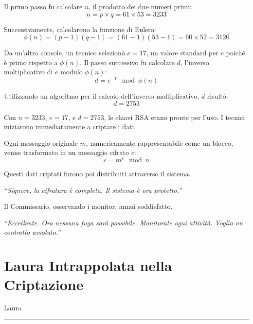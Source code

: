 Il primo passo fu calcolare \( n \), il prodotto dei due numeri primi:
\[
n = p \times q = 61 \times 53 = 3233\]

Successivamente, calcolarono la funzione di Eulero:
\[
\phi(n) = (p-1)(q-1) = (61-1)(53-1) = 60 \times 52 = 3120\]

Da un’altra console, un tecnico selezionò \( e = 17 \), un valore standard per \( e \) poiché è primo rispetto a \( \phi(n) \). Il passo successivo fu calcolare \( d \), l’inverso moltiplicativo di \( e \) modulo \( \phi(n) \):
\[
 d = e^{-1} \mod \phi(n)
\]

Utilizzando un algoritmo per il calcolo dell’inverso moltiplicativo, \( d \) risultò:
\[
 d = 2753
\]

Con \( n = 3233 \), \( e = 17 \), e \( d = 2753 \), le chiavi RSA erano pronte per l’uso. I tecnici iniziarono immediatamente a criptare i dati.

Ogni messaggio originale \( m \), numericamente rappresentabile come un blocco, venne trasformato in un messaggio cifrato \( c \):
\[
 c = m^e \mod n
\]


Questi dati criptati furono poi distribuiti attraverso il sistema.

\begin{tcolorbox}[colback=white!95!green!5, colframe=green!75!black, title=\textbf{Risultato della Cifratura RSA}, fonttitle=\bfseries]
\emph{\enquote{Signore, la cifratura è completa. Il sistema è ora protetto.}}
\end{tcolorbox}

Il Commissario, osservando i monitor, annuì soddisfatto.
\newpage

\begin{tcolorbox}[colback=white!95!blue!5, colframe=blue!75!black, title=\textbf{Commissario}, fonttitle=\bfseries]
\emph{\enquote{Eccellente. Ora nessuna fuga sarà possibile. Monitorate ogni attività. Voglio un controllo assoluto.}}
\end{tcolorbox}



\section{Laura Intrappolata nella Criptazione}

\vspace{1em}
\begin{center}Laura\end{center}
\hrule
\vspace{1em}

